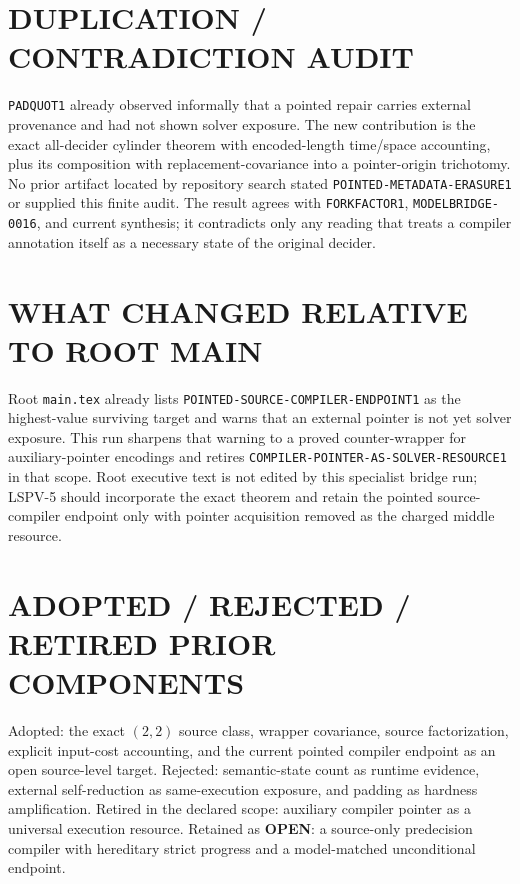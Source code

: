 \documentclass[11pt]{article}
\newcommand{\OPEN}{\textbf{OPEN}}
\begin{document}
\section{DUPLICATION / CONTRADICTION AUDIT}

\texttt{PADQUOT1} already observed informally that a pointed repair carries external provenance and had not shown solver exposure.  The new contribution is the exact all-decider cylinder theorem with encoded-length time/space accounting, plus its composition with replacement-covariance into a pointer-origin trichotomy.  No prior artifact located by repository search stated \texttt{POINTED-METADATA-ERASURE1} or supplied this finite audit.  The result agrees with \texttt{FORKFACTOR1}, \texttt{MODELBRIDGE-0016}, and current synthesis; it contradicts only any reading that treats a compiler annotation itself as a necessary state of the original decider.

\section{WHAT CHANGED RELATIVE TO ROOT MAIN}

Root \texttt{main.tex} already lists \texttt{POINTED-SOURCE-COMPILER-ENDPOINT1} as the highest-value surviving target and warns that an external pointer is not yet solver exposure.  This run sharpens that warning to a proved counter-wrapper for auxiliary-pointer encodings and retires \texttt{COMPILER-POINTER-AS-SOLVER-RESOURCE1} in that scope.  Root executive text is not edited by this specialist bridge run; LSPV-5 should incorporate the exact theorem and retain the pointed source-compiler endpoint only with pointer acquisition removed as the charged middle resource.

\section{ADOPTED / REJECTED / RETIRED PRIOR COMPONENTS}

Adopted: the exact $(2,2)$ source class, wrapper covariance, source factorization, explicit input-cost accounting, and the current pointed compiler endpoint as an open source-level target.  Rejected: semantic-state count as runtime evidence, external self-reduction as same-execution exposure, and padding as hardness amplification.  Retired in the declared scope: auxiliary compiler pointer as a universal execution resource.  Retained as \OPEN: a source-only predecision compiler with hereditary strict progress and a model-matched unconditional endpoint.
\end{document}
